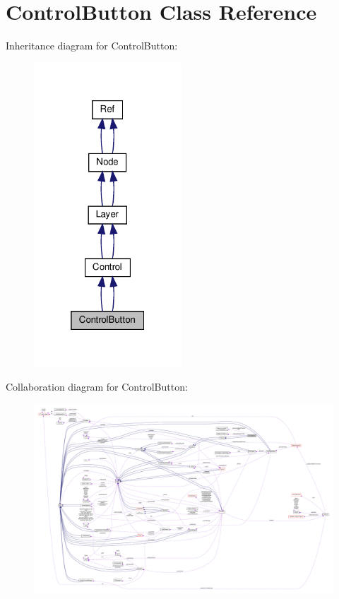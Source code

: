 \hypertarget{classControlButton}{}\section{Control\+Button Class Reference}
\label{classControlButton}


Inheritance diagram for Control\+Button\+:
\nopagebreak
\begin{figure}[H]
\begin{center}
\leavevmode
\includegraphics[width=157pt]{classControlButton__inherit__graph}
\end{center}
\end{figure}


Collaboration diagram for Control\+Button\+:
\nopagebreak
\begin{figure}[H]
\begin{center}
\leavevmode
\includegraphics[width=350pt]{classControlButton__coll__graph}
\end{center}
\end{figure}
